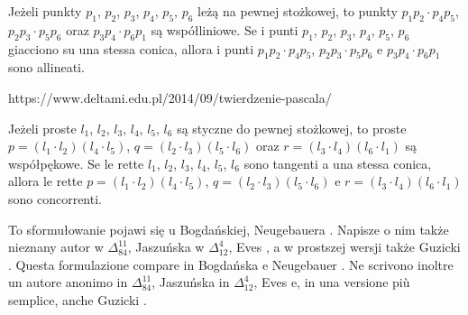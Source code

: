 \begin{theorem}
[Pascala] %
[di Pascal] %
	Jeżeli punkty $p_1$, $p_2$, $p_3$, $p_4$, $p_5$, $p_6$ leżą na pewnej stożkowej, to punkty $p_1p_2 \cdot p_4p_5$, $p_2p_3 \cdot p_5p_6$ oraz $p_3p_4 \cdot p_6p_1$ są współliniowe. %
	Se i punti $p_1$, $p_2$, $p_3$, $p_4$, $p_5$, $p_6$ giacciono su una stessa conica, allora i punti $p_1p_2 \cdot p_4p_5$, $p_2p_3 \cdot p_5p_6$ e $p_3p_4 \cdot p_6p_1$ sono allineati. %
\end{theorem}

https://www.deltami.edu.pl/2014/09/twierdzenie-pascala/

\begin{theorem}
[Brianchona] %
[di Brianchon] %
	Jeżeli proste $l_1$, $l_2$, $l_3$, $l_4$, $l_5$, $l_6$ są styczne do pewnej stożkowej, to proste $p = (l_1 \cdot l_2)(l_4 \cdot l_5)$, $q = (l_2 \cdot l_3)(l_5 \cdot l_6)$ oraz $r = (l_3 \cdot l_4)(l_6 \cdot l_1)$ są współpękowe. %
	Se le rette $l_1$, $l_2$, $l_3$, $l_4$, $l_5$, $l_6$ sono tangenti a una stessa conica, allora le rette $p = (l_1 \cdot l_2)(l_4 \cdot l_5)$, $q = (l_2 \cdot l_3)(l_5 \cdot l_6)$ e $r = (l_3 \cdot l_4)(l_6 \cdot l_1)$ sono concorrenti. %
\end{theorem}


To sformułowanie pojawi się u Bogdańskiej, Neugebauera \cite[s. 123, 265, 266]{neugebauer_2018}. %
Napisze o nim także nieznany autor w $\Delta_{84}^{11}$, Jaszuńska w $\Delta_{12}^4$, Eves \cite[s. 143]{eves1_1972}, a w prostszej wersji także Guzicki \cite[s. 238]{guzicki_2021}. %
Questa formulazione compare in Bogdańska e Neugebauer \cite[pp. 265, 266]{neugebauer_2018}. %
Ne scrivono inoltre un autore anonimo in $\Delta_{84}^{11}$, Jaszuńska in $\Delta_{12}^4$, Eves \cite[p. 143]{eves1_1972} e, in una versione più semplice, anche Guzicki \cite[p. 238]{guzicki_2021}. %

%